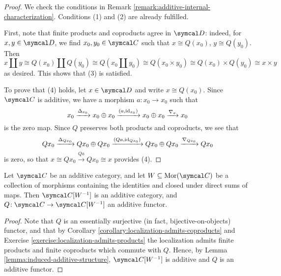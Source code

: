 \begin{proof}
We check the conditions in Remark \ref{remark:additive-internal-characterization}. Conditions (1) and (2) are already fulfilled.

First, note that finite products and coproducts agree in \(\calD\): indeed, for \(x,y\in\calD\), we find \(x_0,y_0\in\calC\) such that \(x\cong Q(x_0)\), \(y\cong Q(y_0)\). Then
\[ x\amalg y \cong Q(x_0)\amalg Q(y_0) \cong Q(x_0\amalg y_0) \cong Q(x_0\times y_0)\cong Q(x_0)\times Q(y_0) \cong x\times y \]
as desired. This shows that (3) is satisfied.

To prove that (4) holds, let \(x\in\calD\) and write \(x\cong Q(x_0)\). Since \(\calC\) is additive, we have a morphism \(a\!:x_0\to x_0\) such that
\[ x_0\xrightarrow{\Delta_{x_0}} x_0\oplus x_0 \xrightarrow{(a,\mathrm{id}_{x_0})} x_0\oplus x_0 \xrightarrow{\nabla_x} x_0 \]
is the zero map. Since \(Q\) preserves both products and coproducts, we see that
\[ Qx_0\xrightarrow{\Delta_{Qx_0}} Qx_0\oplus Qx_0 \xrightarrow{(Qa,\mathrm{id}_{Qx_0})} Qx_0\oplus Qx_0 \xrightarrow{\nabla_{Qx_0}} Qx_0 \]
is zero, so that \(x\cong Qx_0 \overset{Qa}\to Qx_0\cong x\) provides (4).
\end{proof}

\begin{theorem}\label{thm:localization-of-additive-is-additive}
	Let \(\calC\) be an additive category, and let \(W\subseteq\Mor(\calC)\) be a collection of morphisms containing the identities and closed under direct sums of maps. Then
	\(\calC[W^{-1}]\) is an additive category, and \(Q\!:\calC\to\calC[W^{-1}]\) an additive functor.
\end{theorem}
\begin{proof}
Note that \(Q\) is an essentially surjective (in fact, bijective-on-objects) functor, and that by Corollary \ref{corollary:localization-admits-coproducts} and Exercise \ref{exercise:localization-admits-products}
the localization admits finite products and finite coproducts which commute with \(Q\). Hence, by Lemma \ref{lemma:induced-additive-structure}, \(\calC[W^{-1}]\) is additive and \(Q\)
is an additive functor.
\end{proof}


